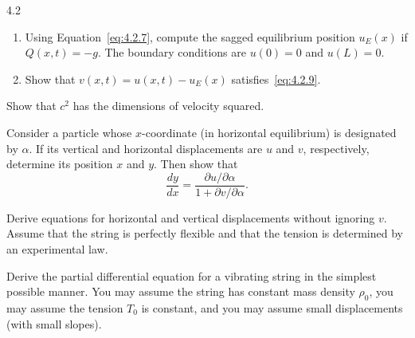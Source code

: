 \begin{exercises}{4.2}

\item
\begin{enumerate}
\item[(a)] Using Equation~\eqref{eq:4.2.7}, compute the sagged equilibrium position $u_E(x)$ if $Q(x,t)=-g$.  The boundary conditions are $u(0)=0$ and $u(L)=0$.

\item[(b)] Show that $v(x,t)=u(x,t)-u_E(x)$ satisfies~\eqref{eq:4.2.9}.
\end{enumerate}

\item Show that $c^2$ has the dimensions of velocity squared.

\item Consider a particle whose $x$-coordinate (in horizontal equilibrium) is designated by $\alpha$.  If its vertical and horizontal displacements are $u$ and $v$, respectively, determine its position $x$ and $y$.  Then show that
\[
\frac{dy}{dx} = \frac{\partial u/\partial\alpha}{1+\partial v/\partial\alpha}.
\]

\item Derive equations for horizontal and vertical displacements without ignoring $v$.  Assume that the string is perfectly flexible and that the tension is determined by an experimental law.

\item Derive the partial differential equation for a vibrating string in the simplest possible manner.  You may assume the string has constant mass density $\rho_0$, you may assume the tension $T_0$ is constant, and you may assume small displacements (with small slopes).

\end{exercises}
